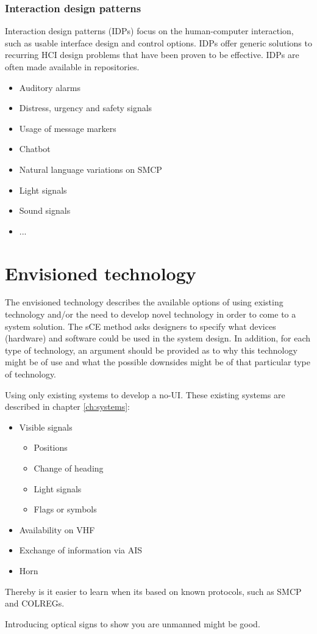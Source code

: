 \subsubsection{Interaction design patterns}
Interaction design patterns (IDPs) focus on the human-computer interaction, such as usable interface design and control options. IDPs offer generic solutions to recurring HCI design problems that have been proven to be effective. IDPs are often made available in repositories.

\begin{itemize}
	\item Auditory alarms
	\item Distress, urgency and safety signals
	\item Usage of message markers
	\item Chatbot
	\item Natural language variations on \ac{SMCP}
	\item Light signals
	\item Sound signals
	\item ...
\end{itemize}

\section{Envisioned technology}
The envisioned technology describes the available options of using existing technology and/or the need to develop novel technology in order to come to a system solution. The sCE method asks designers to specify what devices (hardware) and software could be used in the system design. In addition, for each type of technology, an argument should be provided as to why this technology might be of use and what the possible downsides might be of that particular type of technology.

Using only existing systems to develop a \acf{no-UI}. These existing systems are described in chapter \ref{ch:systems}:

\begin{itemize}
	\item Visible signals
	\begin{itemize}
		\item Positions
		\item Change of heading
		\item Light signals
		\item Flags or symbols
	\end{itemize}
	\item Availability on \ac{VHF}
	\item Exchange of information via \ac{AIS} 
	\item Horn
\end{itemize}

Thereby is it easier to learn when its based on known protocols, such as \acf{SMCP} and \ac{COLREGs}.

Introducing optical signs to show you are unmanned might be good.